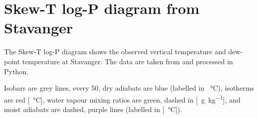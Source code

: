 \chapter{Skew-T log-P diagram from Stavanger}%
\label{app:sounding}
The Skew-T log-P diagram shows the observed vertical temperature and dew-point temperature at Stavanger. The data are taken from \cite{wyoming_atmospheric_2018} and processed in Python.

Isobars are grey lines, every \SI{50}{\hPa}, dry adiabats are blue (labelled in \SI{}{\celsius}), isotherms are red [\SI{}{\celsius}], water vapour mixing ratios are green, dashed in [\SI{}{\gram\per\kilogram}], and moist adiabats are dashed, purple lines (labelled in [\SI{}{\celsius}]).

